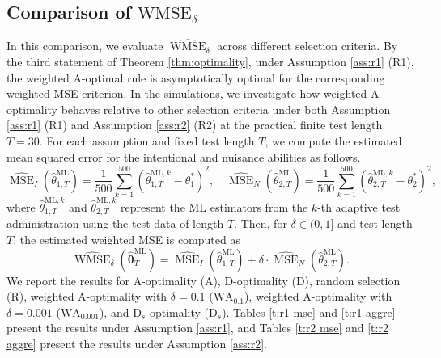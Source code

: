 \documentclass[12pt]{article}
\newcommand{\bftheta}{\boldsymbol{\theta}}
\begin{document}
\subsection{Comparison of $\mathrm{WMSE}_{\delta}$} \label{sub:compare}
In this comparison, we evaluate $\widehat{\operatorname{WMSE}}_{\delta}$ across different selection criteria. By the third statement of Theorem \ref{thm:optimality}, under Assumption \ref{ass:r1} (R1), the weighted A-optimal rule is asymptotically optimal for the corresponding weighted MSE criterion. In the simulations, we investigate how weighted A-optimality behaves relative to other selection criteria under both Assumption \ref{ass:r1} (R1) and Assumption \ref{ass:r2} (R2) at the practical finite test length $T = 30$. For each assumption and fixed test length $T$, we compute the estimated mean squared error for the intentional and nuisance abilities as follows.
\begin{equation} \label{e:hat mse}
\widehat{\operatorname{MSE}}_I(\hat{\theta}_{1,T}^{\mathrm{ML}}) = \frac{1}{500} \sum_{k = 1}^{500} (\hat{\theta}_{1,T}^{\mathrm{ML}, k} - \theta_1^{\ast})^2,
\quad
\widehat{\operatorname{MSE}}_N(\hat{\theta}_{2,T}^{\mathrm{ML}}) = \frac{1}{500} \sum_{k = 1}^{500} (\hat{\theta}_{2,T}^{\mathrm{ML},k} - \theta_2^{\ast})^2,
\end{equation}
where $\hat{\theta}_{1,T}^{\mathrm{ML},k}$ and $\hat{\theta}_{2,T}^{\mathrm{ML},k}$ represent the ML estimators from the $k$-th adaptive test 
administration using the test data of length $T$. Then, for $\delta \in (0,1]$ and test length $T$, the estimated weighted MSE is computed as
\begin{equation} \label{e:hat wmse}
\widehat{\operatorname{WMSE}}_{\delta}(\hat{\bftheta}_{T}^{\mathrm{ML}}) = \widehat{\operatorname{MSE}}_I(\hat{\theta}_{1,T}^{\mathrm{ML}}) + \delta \cdot \widehat{\operatorname{MSE}}_N(\hat{\theta}_{2,T}^{\mathrm{ML}}).
\end{equation}
We report the results for A-optimality (A), D-optimality (D), random selection (R), weighted A-optimality with $\delta = 0.1$ ($\mathrm{WA}_{0.1}$), weighted A-optimality with $\delta= 0.001$ ($\mathrm{WA}_{0.001}$), and $\mathrm{D}_s$-optimality ($\mathrm{D}_s$). Tables \ref{t:r1 mse} and \ref{t:r1 aggre} present the results under Assumption \ref{ass:r1}, and Tables \ref{t:r2 mse} and \ref{t:r2 aggre} present the results under Assumption \ref{ass:r2}.
\end{document}
